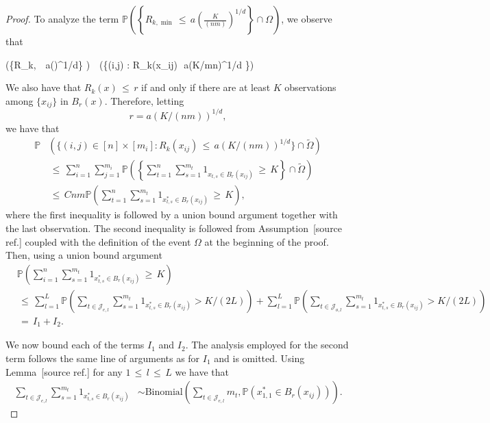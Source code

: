 \documentclass[twoside,11pt]{article}
\makeatletter
\newcommand{\discardlabel}[1]{}
\newcommand{\discardtwo}[2]{}
\newcommand{\legacyref}[1]{\textup{[source ref.]}}
\newcommand{\legacyeqref}[1]{\textup{[source equation]}}
\newenvironment{legacycomparison}{%
  \begingroup\color{legacygray}%
  \let\label\discardlabel
  \let\originallabel\discardlabel
  \let\ref\legacyref
  \let\pageref\legacyref
  \let\eqref\legacyeqref
  \let\cref\legacyref
  \let\Cref\legacyref
  \let\autoref\legacyref
  \let\aliasref\discardtwo
}{\endgroup}
\newcommand{\aliasref}[2]{%
  \@ifundefined{r@#2}{}{%
    \expandafter\let\csname r@#1\expandafter\endcsname\csname r@#2\endcsname}}
\makeatother
\begin{document}
\begin{legacycomparison}
\begin{proof}
To analyze the term $\mathbb{P}\left(\left\{R_{k,\min} \,\leq\, a\left(\frac{K}{(nm)}\right)^{1/d}\right\} \cap\Omega\right)$, we observe that

\beq 
\label{eq:275}
\left(\left\{R_{k,\min} \,\leq\, a\left(\right)^{1/d}\right\} \cap\Omega\right) \,\leq\, \left(\left\{\left(\exists i,j\right) \in [n] \times [m_i] : R_k(x_{ij})\,\leq\, a(K/mn)^{1/d} \right\}\cap \tilde \Omega\right)
\beq 

We also have that $R_k(x) \,\leq\, r$ if and only if there are at least $K$ observations among $\{x_{ij}\}$ in $B_r(x)$. Therefore, letting
\begin{equation}
r = a(K/(nm))^{1/d},
\label{eq:276}
\end{equation}
we have that
\begin{align}
\mathbb{P} &\left( \{(i,j) \in [n] \times [m_i] : R_k(x_{ij}) \,\leq\, a(K/(nm))^{1/d}\} \cap \tilde \Omega \right) \nonumber \\
&\,\leq\, \sum_{i=1}^{n} \sum_{j=1}^{m_i} \mathbb{P}\left( \left\{ \sum_{t=1}^{n}\sum_{s=1}^{m_t} 1_{ x_{t,s} \in B_{r}(x_{ij}) } \,\geq\, K \right\}\cap \tilde \Omega \right) \nonumber \\
&\,\leq\, Cnm \mathbb{P}\left( \sum_{t=1}^n\sum_{s=1}^{m_t} 1_{x_{t,s}^* \in B_{r}(x_{ij})} \,\geq\, K \right), \label{eq:277}
\end{align}
where the first inequality is followed by a union bound argument together with the last observation. The second inequality is followed from Assumption~\ref{asm:m} coupled with the definition of the event $\Omega$ at the beginning of the proof. Then, using a union bound argument
\begin{align}
&\mathbb{P} \left( \sum_{i=1}^{n} \sum_{s=1}^{m_t} 1_{x_{t,s}^* \in B_{r}(x_{ij})} \,\geq\, K \right) 
\\& \,\leq\, \sum_{l=1}^{L} \mathbb{P}\left(\sum_{t \in \mathcal{J}_{e,l}}\sum_{s=1}^{m_t} 1_{x_{t,s}^* \in B_{r}(x_{ij})} > K/(2L) \right) \nonumber  + \sum_{l=1}^{L} \mathbb{P}\left(\sum_{t \in \mathcal{J}_{o,l}}\sum_{s=1}^{m_t} 1_{x_{t,s}^* \in B_{r}(x_{ij})} > K/(2L) \right) \nonumber \\
&\,=\, I_1 + I_2. \label{eq:278}
\end{align}

We now bound each of the terms \( I_1 \) and \( I_2 \). The analysis employed for the second term follows the same line of arguments as for \( I_1 \) and is omitted. Using Lemma~\ref{Lemma_9} for any \( 1 \,\leq\, l \,\leq\, L \) we have that
\begin{align}
    \sum_{t \in \mathcal{J}_{e,l}} \sum_{s=1}^{m_t} 1_{x_{t,s}^* \in B_{r}(x_{ij})} 
    &\sim \text{Binomial} \left( \sum_{t \in \mathcal{J}_{e,l}} m_t, \mathbb{P}(x_{1,1}^* \in B_{r}(x_{ij})) \right). \label{eq:279}
\end{align}


\end{proof}
\end{legacycomparison}
\end{document}
